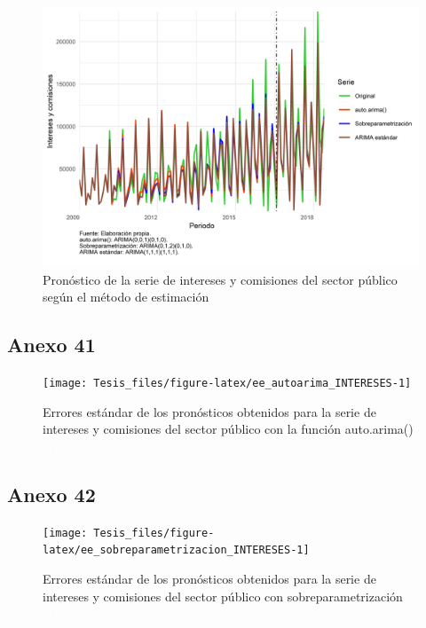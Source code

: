 \documentclass[
]{article}
\begin{document}
\begin{figure}[H]
\includegraphics[width=1\linewidth,height=1\textheight]{Tesis_files/figure-latex/pronostico_INTERESES-1} \caption{Pronóstico de la serie de intereses y comisiones del sector público según el método de estimación \textcolor{white}{prueba de aaaaaaaaaaaaaaaaaaaaaaa}}\label{fig:pronostico_INTERESES}
\end{figure}

\subsection{Anexo 41}

\begin{figure}[H]
\texttt{[image: Tesis\_files/figure-latex/ee\_autoarima\_INTERESES-1]} \caption{Errores estándar de los pronósticos obtenidos para la serie de intereses y comisiones del sector público con la función auto.arima() \textcolor{white}{prueba de aaaaaaaaaaaaaaaaaaaaaaa}}\label{fig:ee_autoarima_INTERESES}
\end{figure}

\subsection{Anexo 42}

\begin{figure}[H]
\texttt{[image: Tesis\_files/figure-latex/ee\_sobreparametrizacion\_INTERESES-1]} \caption{Errores estándar de los pronósticos obtenidos para la serie de intereses y comisiones del sector público con sobreparametrización \textcolor{white}{prueba de aaaaaaaaaaaaaaaaaaaaaaa}}\label{fig:ee_sobreparametrizacion_INTERESES}
\end{figure}
\end{document}
